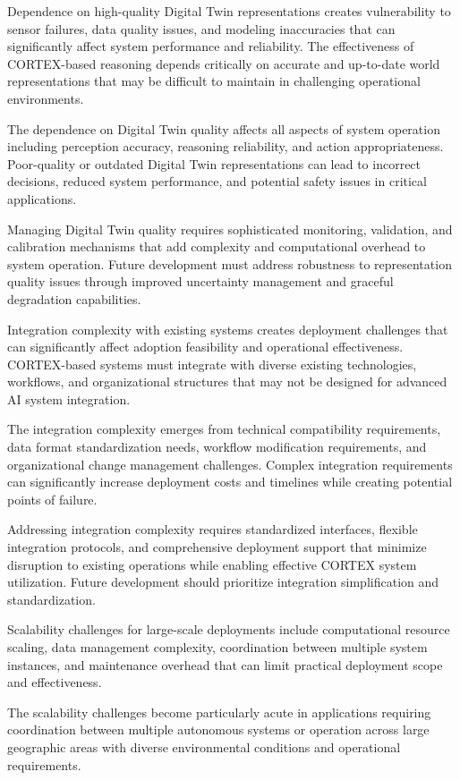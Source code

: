 Dependence on high-quality Digital Twin representations creates vulnerability to sensor failures, data quality issues, and modeling inaccuracies that can significantly affect system performance and reliability. The effectiveness of CORTEX-based reasoning depends critically on accurate and up-to-date world representations that may be difficult to maintain in challenging operational environments.

The dependence on Digital Twin quality affects all aspects of system operation including perception accuracy, reasoning reliability, and action appropriateness. Poor-quality or outdated Digital Twin representations can lead to incorrect decisions, reduced system performance, and potential safety issues in critical applications.

Managing Digital Twin quality requires sophisticated monitoring, validation, and calibration mechanisms that add complexity and computational overhead to system operation. Future development must address robustness to representation quality issues through improved uncertainty management and graceful degradation capabilities.

Integration complexity with existing systems creates deployment challenges that can significantly affect adoption feasibility and operational effectiveness. CORTEX-based systems must integrate with diverse existing technologies, workflows, and organizational structures that may not be designed for advanced AI system integration.

The integration complexity emerges from technical compatibility requirements, data format standardization needs, workflow modification requirements, and organizational change management challenges. Complex integration requirements can significantly increase deployment costs and timelines while creating potential points of failure.

Addressing integration complexity requires standardized interfaces, flexible integration protocols, and comprehensive deployment support that minimize disruption to existing operations while enabling effective CORTEX system utilization. Future development should prioritize integration simplification and standardization.

Scalability challenges for large-scale deployments include computational resource scaling, data management complexity, coordination between multiple system instances, and maintenance overhead that can limit practical deployment scope and effectiveness.

The scalability challenges become particularly acute in applications requiring coordination between multiple autonomous systems or operation across large geographic areas with diverse environmental conditions and operational requirements.

